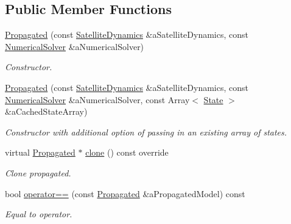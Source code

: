 \subsection*{Public Member Functions}
\begin{DoxyCompactItemize}
\item 
\hyperlink{classostk_1_1astro_1_1trajectory_1_1orbit_1_1models_1_1_propagated_ac45b9e7bee7892a67e6eea66561e6fe6}{Propagated} (const \hyperlink{classostk_1_1astro_1_1flight_1_1system_1_1dynamics_1_1_satellite_dynamics}{Satellite\+Dynamics} \&a\+Satellite\+Dynamics, const \hyperlink{classostk_1_1astro_1_1_numerical_solver}{Numerical\+Solver} \&a\+Numerical\+Solver)
\begin{DoxyCompactList}\small\item\em Constructor. \end{DoxyCompactList}\item 
\hyperlink{classostk_1_1astro_1_1trajectory_1_1orbit_1_1models_1_1_propagated_a58c26549679d4e20c45e3092ad549d4a}{Propagated} (const \hyperlink{classostk_1_1astro_1_1flight_1_1system_1_1dynamics_1_1_satellite_dynamics}{Satellite\+Dynamics} \&a\+Satellite\+Dynamics, const \hyperlink{classostk_1_1astro_1_1_numerical_solver}{Numerical\+Solver} \&a\+Numerical\+Solver, const Array$<$ \hyperlink{classostk_1_1astro_1_1trajectory_1_1_state}{State} $>$ \&a\+Cached\+State\+Array)
\begin{DoxyCompactList}\small\item\em Constructor with additional option of passing in an existing array of states. \end{DoxyCompactList}\item 
virtual \hyperlink{classostk_1_1astro_1_1trajectory_1_1orbit_1_1models_1_1_propagated}{Propagated} $\ast$ \hyperlink{classostk_1_1astro_1_1trajectory_1_1orbit_1_1models_1_1_propagated_a283639d985495c05adb9e80edb91cd12}{clone} () const override
\begin{DoxyCompactList}\small\item\em Clone propagated. \end{DoxyCompactList}\item 
bool \hyperlink{classostk_1_1astro_1_1trajectory_1_1orbit_1_1models_1_1_propagated_a88777b83d939ca894a20af525db347b8}{operator==} (const \hyperlink{classostk_1_1astro_1_1trajectory_1_1orbit_1_1models_1_1_propagated}{Propagated} \&a\+Propagated\+Model) const
\begin{DoxyCompactList}\small\item\em Equal to operator. \end{DoxyCompactList}\item 

\end{DoxyCompactItemize}
